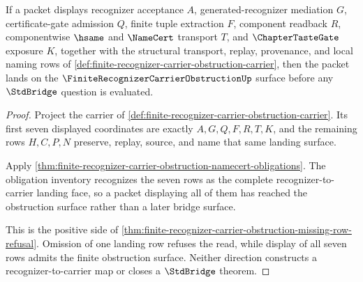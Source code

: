 \begin{theorem}
\label{thm:finite-recognizer-carrier-seven-row-landing}
If a packet displays recognizer acceptance $A$, generated-recognizer mediation $G$, certificate-gate admission $Q$, finite tuple extraction $F$, component readback $R$, componentwise $\hsame$ and $\NameCert$ transport $T$, and $\ChapterTasteGate$ exposure $K$, together with the structural transport, replay, provenance, and local naming rows of \autoref{def:finite-recognizer-carrier-obstruction-carrier}, then the packet lands on the $\FiniteRecognizerCarrierObstructionUp$ surface before any $\StdBridge$ question is evaluated.
\end{theorem}
\begin{proof}
Project the carrier of \autoref{def:finite-recognizer-carrier-obstruction-carrier}. Its first seven displayed coordinates are exactly $A,G,Q,F,R,T,K$, and the remaining rows $H,C,P,N$ preserve, replay, source, and name that same landing surface.

Apply \autoref{thm:finite-recognizer-carrier-obstruction-namecert-obligations}. The obligation inventory recognizes the seven rows as the complete recognizer-to-carrier landing face, so a packet displaying all of them has reached the obstruction surface rather than a later bridge surface.

This is the positive side of \autoref{thm:finite-recognizer-carrier-obstruction-missing-row-refusal}. Omission of one landing row refuses the read, while display of all seven rows admits the finite obstruction surface. Neither direction constructs a recognizer-to-carrier map or closes a $\StdBridge$ theorem.
\end{proof}

